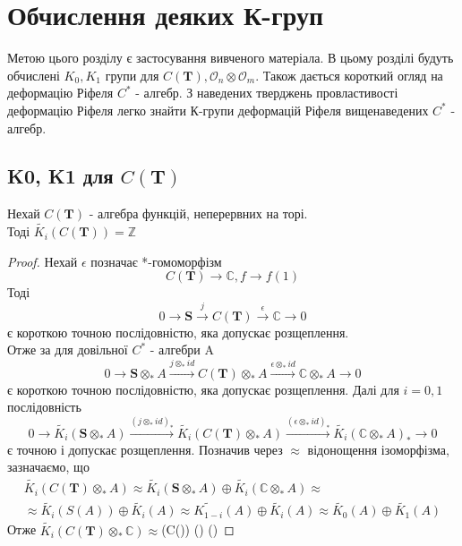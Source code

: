 \newpage
\section{Обчислення деяких К-груп}
Метою цього розділу є застосування вивченого матеріала. В цьому розділі будуть обчислені $K_0, K_1$ групи для
$C(\mathbf{T}), \mathcal{O}_n \otimes \mathcal{O}_m$. Також дається короткий огляд на деформацію Ріфеля $C^*$ - алгебр.
З наведених тверджень провластивості деформацію Ріфеля легко знайти К-групи деформацій Ріфеля вищенаведених $C^*$ - алгебр.
\subsection{K0, K1 для $C(\mathbf{T})$}
\begin{theorem}
    Нехай $C(\mathbf{T})$ - алгебра функцій, неперервних на торі. \\
    Тоді $\widetilde{K_i}(C(\mathbf{T})) = \mathbb{Z}$

    \begin{proof}
        Нехай $\epsilon$ позначає *-гомоморфізм
        \begin{equation*}
            C(\mathbf{T}) \to \mathbb{C}, f \to f(1)
        \end{equation*}
        Тоді
        \begin{equation*}
            0 \to \mathbf{S} \xrightarrow{j} C(\mathbf{T}) \xrightarrow{\epsilon} \mathbb{C} \to 0
        \end{equation*}
        є короткою точною послідовністю, яка допускає розщеплення. \\
        Отже за для довільної $C^*$ - алгебри A
        \begin{equation*}
            0 \to \mathbf{S} \otimes_* A \xrightarrow{j \otimes_* id} C(\mathbf{T}) \otimes_* A \xrightarrow{\epsilon \otimes_* id} \mathbb{C} \otimes_* A \to 0
        \end{equation*}
        є короткою точною послідовністю, яка допускає розщеплення.
        Далі для $i=0,1$ послідовність
        \begin{equation*}
            0 \to \widetilde{K_i}(\mathbf{S} \otimes_* A) \xrightarrow{(j \otimes_* id)_*} \widetilde{K_i}(C(\mathbf{T}) \otimes_* A) \xrightarrow{(\epsilon \otimes_* id)_*} \widetilde{K_i}(\mathbb{C} \otimes_* A)_* \to 0
        \end{equation*}
        є точною і допускає розщеплення.
        Позначив через $\approx$ відонощення ізоморфізма, зазначаємо, що
        \begin{multline*}
            \widetilde{K_i}(C(\mathbf{T}) \otimes_* A) \approx \widetilde{K_i}(\mathbf{S} \otimes_* A) \oplus \widetilde{K_i}(\mathbb{C} \otimes_* A) \approx \\
            \approx \widetilde{K_i}(S(A)) \oplus \widetilde{K_i}(A) \approx \widetilde{K_{1 - i}}(A) \oplus \widetilde{K_i}(A) \approx \widetilde{K_0}(A) \oplus \widetilde{K_1}(A)
        \end{multline*}
        Отже $\widetilde{K_i}(C(\mathbf{T}) \otimes_* \mathbb{C}) \approx $(C()) \approx {}() \oplus {}() \approx {}
    \end{proof}
    \end{theorem}
